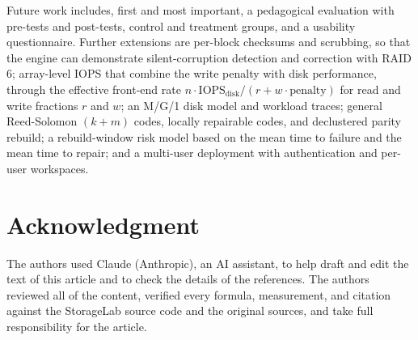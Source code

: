 \documentclass{ieeeaccess}
\begin{document}
Future work includes, first and most important, a pedagogical evaluation with pre-tests and post-tests, control and treatment groups, and a usability questionnaire. Further extensions are per-block checksums and scrubbing, so that the engine can demonstrate silent-corruption detection and correction with RAID 6; array-level IOPS that combine the write penalty with disk performance, through the effective front-end rate $n \cdot \text{IOPS}_{\text{disk}} / (r + w \cdot \text{penalty})$ for read and write fractions $r$ and $w$; an M/G/1 disk model and workload traces; general Reed-Solomon $(k+m)$ codes, locally repairable codes, and declustered parity rebuild; a rebuild-window risk model based on the mean time to failure and the mean time to repair; and a multi-user deployment with authentication and per-user workspaces.

\section*{Acknowledgment}
The authors used Claude (Anthropic), an AI assistant, to help draft and edit the text of this article and to check the details of the references. The authors reviewed all of the content, verified every formula, measurement, and citation against the StorageLab source code and the original sources, and take full responsibility for the article.
\end{document}
